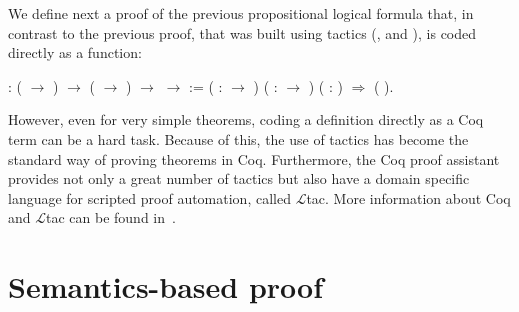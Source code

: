We define next a proof of the previous propositional logical formula
that, in contrast to the previous proof, that was built using tactics
(,  and ), is coded
directly as a function:
 \begin{coqdoccode}
\coqdocemptyline
\coqdocnoindent
{} \coqdoceol
\coqdocindent{1.00em}
: ( \ensuremath{\rightarrow} ) \ensuremath{\rightarrow} ( \ensuremath{\rightarrow} ) \ensuremath{\rightarrow}  \ensuremath{\rightarrow}  :=\coqdoceol
\coqdocindent{1.50em}
 ( :  \ensuremath{\rightarrow} ) ( :  \ensuremath{\rightarrow} ) ( : ) \ensuremath{\Rightarrow}  ( ).\coqdoceol
\coqdocemptyline
\end{coqdoccode}
However, even for very simple theorems, coding a definition directly
as a Coq term can be a hard task. Because of this, the use of tactics
has become the standard way of proving theorems in Coq. Furthermore,
the Coq proof assistant provides not only a great number of tactics
but also have a domain specific language for scripted proof automation,
called $\mathcal{L}$tac. More information about Coq and  $\mathcal{L}$tac can be found
in~\cite{Chlipala13,Bertot04}.


\section{Semantics-based proof}\label{sec:semantics}


